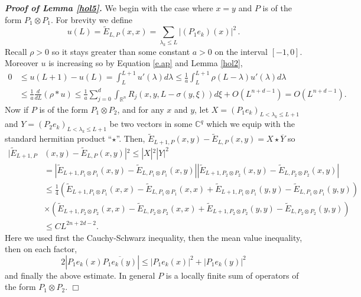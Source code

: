 \documentclass[10pt,twoside]{article}
\newcommand{\R}{\mathbb{R}}
\newcommand{\C}{\mathbb{C}}
\newenvironment{prf}[1][]
{\vskip 2mm  {\it \bf Proof#1. }}{$\Box$ \vskip 2mm}
\numberwithin{theorem}{section}
\begin{document}
\begin{prf}[ of Lemma \ref{hol5}]
We begin with the case where $x=y$ and $P$ is of the form $P_1\otimes P_1$. For brevity we define
\[u(L)=\tilde{E}_{L,P}(x,x)=\sum_{\lambda_k\leq L}|(P_1 e_k)(x)|^2\,.\]
Recall $\rho>0$ so it stays greater than some constant $a>0$ on the interval $[-1,0]$. Moreover $u$ is increasing so by Equation \eqref{e.ap} and Lemma \ref{hol2},
\begin{align*}
0&\leq u(L+1)-u(L)=\int_L^{L+1}u'(\lambda)d\lambda\leq \frac{1}{a}\int_L^{L+1}\rho(L-\lambda)u'(\lambda)d\lambda\\
 &\leq \frac{1}{a}\frac{d}{dL}(\rho*u)\leq \frac{1}{a}\sum_{j=0}^d \int_{\R^n} R_j(x,y,L-\sigma(y,\xi))d\xi +O(L^{n+d-1})=O(L^{n+d-1}).
\end{align*}
Now if $P$ is of the form $P_1\otimes P_2$, and for any $x$ and $y$, let $X=(P_1 e_k)_{L<\lambda_k\leq L+1}$ and $Y=(P_2 e_k)_{L<\lambda_k\leq L+1}$ be two vectors in some $\C^q$ which we equip with the standard hermitian product ``$\star$''. Then, $\tilde{E}_{L+1,P}(x,y)-\tilde{E}_{L,P}(x,y)=X\star \overline{Y}$ so
\begin{align*}
|\tilde{E}_{L+1,P}&(x,y)-\tilde{E}_{L,P}(x,y)|^2\leq |X|^2|Y|^2\\
                   &=|\tilde{E}_{L+1,P_1\otimes P_1}(x,y)-\tilde{E}_{L,P_1\otimes P_1}(x,y)||\tilde{E}_{L+1,P_2\otimes P_2}(x,y)-\tilde{E}_{L,P_2\otimes P_2}(x,y)|\\
                   &\leq \frac{1}{4}\left(\tilde{E}_{L+1,P_1\otimes P_1}(x,x)-\tilde{E}_{L,P_1\otimes P_1}(x,x)+\tilde{E}_{L+1,P_1\otimes P_1}(y,y)-\tilde{E}_{L,P_1\otimes P_1}(y,y)\right)\\
                   &\times\left(\tilde{E}_{L+1,P_2\otimes P_2}(x,x)-\tilde{E}_{L,P_2\otimes P_2}(x,x)+\tilde{E}_{L+1,P_2\otimes P_2}(y,y)-\tilde{E}_{L,P_2\otimes P_2}(y,y)\right)\\
                   &\leq C L^{2n+2d-2}.
\end{align*}
Here we used first the Cauchy-Schwarz inequality, then the mean value inequality, then on each factor,
\[2|P_1 e_k(x)\overline{P_1 e_k(y)}|\leq |P_1 e_k(x)|^2+|P_1 e_k(y)|^2\]
and finally the above estimate. In general $P$ is a locally finite sum of operators of the form $P_1\otimes P_2$.
\end{prf}
\end{document}
